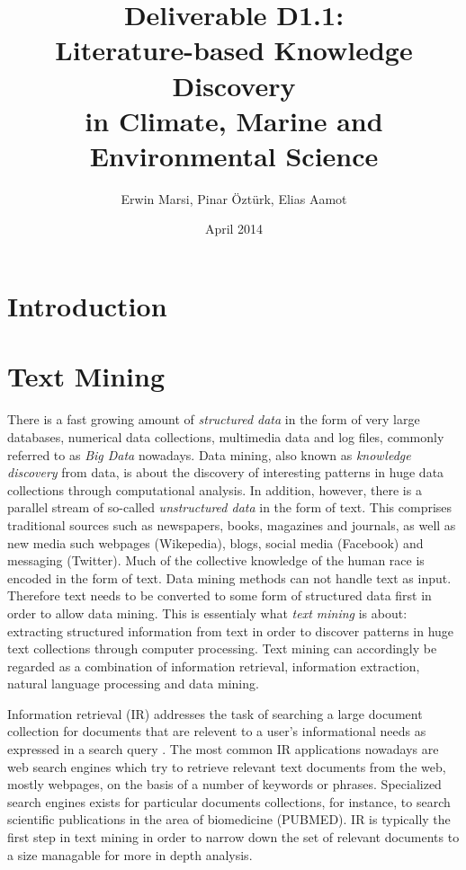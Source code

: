 \documentclass[11pt,oneside,a4paper]{report}
\begin{document}
\title{Deliverable D1.1:\\ Literature-based Knowledge Discovery\\in Climate, Marine and Environmental Science}
\author{Erwin Marsi, Pinar \"Ozt\"urk, Elias Aamot}
\date{April 2014}
\maketitle

\abstract{}

\tableofcontents


\chapter{Introduction}


\chapter{Text Mining}


There is a fast growing amount of \emph{structured data} in the form of very large databases, numerical data collections, multimedia data and log files, commonly referred to as \emph{Big Data} nowadays.
Data mining, also known as \emph{knowledge discovery} from data, is about the discovery of interesting patterns in huge data collections through computational analysis.
In addition, however, there is a parallel stream of so-called \emph{unstructured data} in the form of text.
This comprises traditional sources such as newspapers, books, magazines and journals, as well as new media such webpages (Wikepedia), blogs, social media (Facebook) and messaging (Twitter).
Much of the collective knowledge of the human race is encoded in the form of text. 
Data mining methods can not handle text as input.
Therefore text needs to be converted to some form of structured data first in order to allow data mining.
This is essentialy what \emph{text mining} is about: extracting structured information from text in order to discover patterns in huge text collections through computer processing.
Text mining can accordingly be regarded as a combination of information retrieval, information extraction, natural language processing and data mining.

Information retrieval (IR) addresses the task of searching a large document collection for documents that are relevent to a user's informational needs as expressed in a search query \citep{ManningRaghavanSchutze:08}. 
The most common IR applications nowadays are web search engines which try to retrieve relevant text documents from the web, mostly webpages, on the basis of a number of keywords or phrases.
Specialized search engines exists for particular documents collections, for instance, to search scientific publications in the area of biomedicine (PUBMED).
IR is typically the first step in text mining in order to narrow down the set of relevant documents to a size managable for more in depth analysis.
\end{document}
